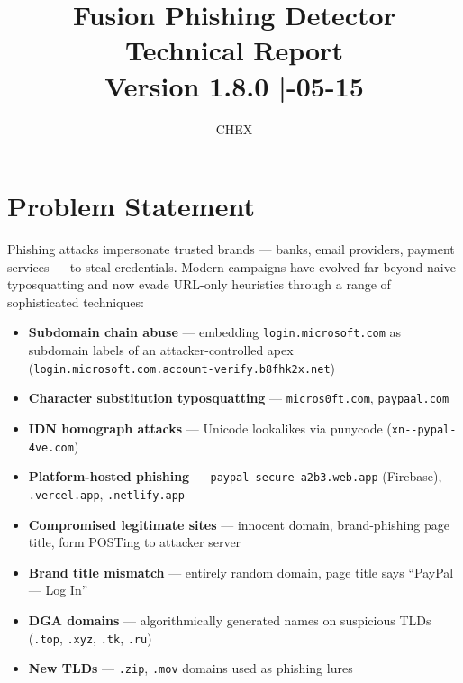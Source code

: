 \documentclass[11pt,a4paper]{article}
\title{%
  \textbf{Fusion Phishing Detector}\\[0.5em]
  \large Technical Report\\[0.3em]
  \normalsize Version 1.8.0 \quad|\quad 2026-05-15
}
\author{CHEX}
\date{}
\newcommand{\code}[1]{\texttt{#1}}
\begin{document}

\maketitle
\thispagestyle{empty}
\vspace{1em}

\tableofcontents
\newpage

\section{Problem Statement}

Phishing attacks impersonate trusted brands --- banks, email providers,
payment services --- to steal credentials. Modern campaigns have
evolved far beyond naive typosquatting and now evade URL-only
heuristics through a range of sophisticated techniques:

\begin{itemize}[noitemsep]
  \item \textbf{Subdomain chain abuse} --- embedding
        \code{login.microsoft.com} as subdomain labels of an
        attacker-controlled apex
        (\code{login.microsoft.com.account-verify.b8fhk2x.net})
  \item \textbf{Character substitution typosquatting} ---
        \code{micros0ft.com}, \code{paypaal.com}
  \item \textbf{IDN homograph attacks} --- Unicode lookalikes via
        punycode (\code{xn-{}-pypal-4ve.com})
  \item \textbf{Platform-hosted phishing} ---
        \code{paypal-secure-a2b3.web.app} (Firebase), \code{.vercel.app},
        \code{.netlify.app}
  \item \textbf{Compromised legitimate sites} --- innocent domain,
        brand-phishing page title, form POSTing to attacker server
  \item \textbf{Brand title mismatch} --- entirely random domain, page
        title says ``PayPal --- Log In''
  \item \textbf{DGA domains} --- algorithmically generated names on
        suspicious TLDs (\code{.top}, \code{.xyz}, \code{.tk},
        \code{.ru})
  \item \textbf{New TLDs} --- \code{.zip}, \code{.mov} domains used
        as phishing lures
\end{itemize}
\end{document}
